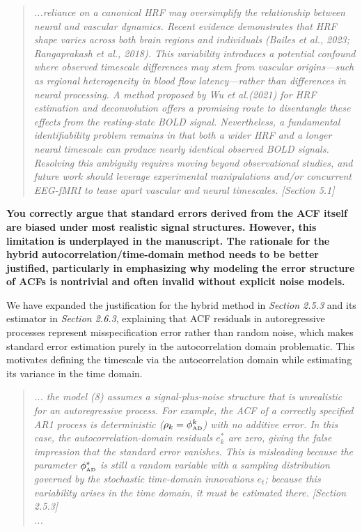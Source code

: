 \documentclass[docs/main.tex]{subfiles}
\newcommand{\reviewercomment}[1]{\vspace{0.3cm}\noindent\textbf{#1}\vspace{0.15cm}}
\newcommand{\manuscriptquote}[1]{\begin{quote}\textit{#1}\end{quote}}
\begin{document}
\manuscriptquote{...reliance on a canonical HRF may oversimplify the relationship between neural and vascular dynamics. Recent evidence demonstrates that HRF shape varies across both brain regions and individuals (Bailes et al., 2023; Rangaprakash et al., 2018). This variability introduces a potential confound where observed timescale differences may stem from vascular origins—such as regional heterogeneity in blood flow latency—rather than differences in neural processing. A method proposed by Wu et al.(2021) for HRF estimation and deconvolution offers a promising route to disentangle these effects from the resting-state BOLD signal. Nevertheless, a fundamental identifiability problem remains in that both a wider HRF and a longer neural timescale can produce nearly identical observed BOLD signals. Resolving this ambiguity requires moving beyond observational studies, and future work should leverage experimental manipulations and/or concurrent EEG-fMRI to tease apart vascular and neural timescales. [Section 5.1]}

\manuscriptquote{}

\reviewercomment{You correctly argue that standard errors derived from the ACF itself are biased under most realistic signal structures. However, this limitation is underplayed in the manuscript. The rationale for the hybrid autocorrelation/time-domain method needs to be better justified, particularly in emphasizing why modeling the error structure of ACFs is nontrivial and often invalid without explicit noise models.}

We have expanded the justification for the hybrid method in \textit{Section 2.5.3} and its estimator in \textit{Section 2.6.3}, explaining that ACF residuals in autoregressive processes represent misspecification error rather than random noise, which makes standard error estimation purely in the autocorrelation domain problematic. This motivates defining the timescale via the autocorrelation domain while estimating its variance in the time domain.

\manuscriptquote{... the model (8) assumes a signal-plus-noise structure that is unrealistic for an autoregressive process. For example, the ACF of a correctly specified AR1 process is deterministic ($\rho_k=\phi_{\scriptscriptstyle\text{AD}}^k$) with no additive error. In this case, the autocorrelation-domain residuals $e_k^*$ are zero, giving the false impression that the standard error vanishes. This is misleading because the parameter $\phi_{\scriptscriptstyle\text{AD}}^*$ is still a random variable with a sampling distribution governed by the stochastic time-domain innovations $e_t$; because this variability arises in the time domain, it must be estimated there. [Section 2.5.3]\\...}
\end{document}
